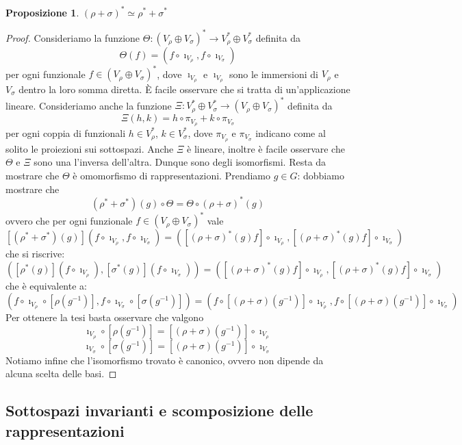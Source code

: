 \documentclass[11pt]{article}
\theoremstyle{plain}
\newtheorem{prop}[thm]{Proposizione}
\theoremstyle{definition}
\theoremstyle{remark}
\DeclareMathOperator{\iso}{\simeq}
\begin{document}
\begin{prop}
$(\rho + \sigma)^* \iso \rho^* + \sigma^*$
\end{prop}
\begin{proof}
Consideriamo la funzione $\Theta : (V_\rho \oplus V_\sigma)^*\to V_\rho ^* \oplus V_\sigma ^*$ definita da
\[ \Theta(f) = (f\circ \imath_{V_\rho}, f\circ \imath_{V_\sigma}) \]
per ogni funzionale $f\in (V_\rho \oplus V_\sigma)^*$, dove $\imath_{V_\rho}$ e $\imath_{V_\rho}$ sono le immersioni di $V_\rho$ e $V_\sigma$ dentro la loro somma diretta.
\`E facile osservare che si tratta di un'applicazione lineare. Consideriamo anche
la funzione $\Xi: V_\rho ^* \oplus V_\sigma ^* \to (V_\rho \oplus V_\sigma)^*$ definita da
\[ \Xi(h,k) = h\circ\pi_{V_\rho} + k\circ\pi_{V_\sigma} \]
per ogni coppia di funzionali $h\in V_\rho ^*$, $k\in V_\sigma ^*$,
dove $\pi_{V_\rho}$ e $\pi_{V_\sigma}$ indicano come al solito le proiezioni sui sottospazi.
Anche $\Xi$ è lineare, inoltre è facile osservare che $\Theta$ e $\Xi$ sono una l'inversa dell'altra. Dunque sono degli
isomorfismi. Resta da mostrare che $\Theta$ è omomorfismo di rappresentazioni. Prendiamo $g\in G$: dobbiamo mostrare che
\[ (\rho^*+\sigma^*)(g) \circ \Theta = \Theta \circ (\rho + \sigma)^*(g) \]
ovvero che per ogni funzionale $f\in (V_\rho \oplus V_\sigma)^*$ vale
\[ [(\rho^*+\sigma^*)(g)] (f\circ \imath_{V_\rho}, f\circ \imath_{V_\sigma}) = ([(\rho + \sigma)^*(g)f]\circ \imath_{V_\rho}, [(\rho + \sigma)^*(g)f]\circ \imath_{V_\sigma}) \]
che si riscrive:
\[ ([\rho^*(g)](f\circ \imath_{V_\rho}), [\sigma^*(g)](f\circ \imath_{V_\sigma})) = ([(\rho + \sigma)^*(g)f]\circ \imath_{V_\rho}, [(\rho + \sigma)^*(g)f]\circ \imath_{V_\sigma}) \]
che è equivalente a:
\[ (f\circ \imath_{V_\rho} \circ [\rho(g^{-1})], f\circ \imath_{V_\sigma}\circ[\sigma(g^{-1})]) = (f\circ [(\rho+\sigma)(g^{-1})] \circ \imath_{V_\rho} , f\circ[(\rho+\sigma)(g^{-1})]\circ \imath_{V_\sigma}) \]
Per ottenere la tesi basta osservare che valgono
\[ \imath_{V_\rho} \circ [\rho(g^{-1})] = [(\rho+\sigma)(g^{-1})] \circ \imath_{V_\rho}\]
\[\imath_{V_\sigma} \circ [\sigma(g^{-1})] = [(\rho+\sigma)(g^{-1})] \circ \imath_{V_\sigma}\]
Notiamo infine che l'isomorfismo trovato è canonico, ovvero non dipende da alcuna scelta delle basi.
\end{proof}





\subsection{Sottospazi invarianti e scomposizione delle rappresentazioni}
\end{document}
